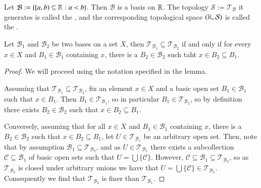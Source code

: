 \documentclass[12pt, a4paper, oneside, openright, titlepage]{book}
\begin{document}
\begin{definition}
    Let $\mathcal{B} := \{[a,b)\subseteq\mathbb R:a <b\}$. Then $\mathcal{B}$ is a basis on $\mathbb R$. The topology $\mathcal{S} := \mathcal{T}_{\mathcal{B}}$ it generates is called the , and the corresponding topological space $(\mathbb R,\mathcal{S})$ is called the . 
\end{definition}

\begin{lemma}
    Let $\mathcal{B}_1$ and $\mathcal{B}_2$ be two bases on a set $X$, then $\mathcal{T}_{\mathcal{B}_1} \subseteq \mathcal{T}_{\mathcal{B}_2}$ if and only if for every $x \in X$ and $B_1 \in \mathcal{B}_1$ containing $x$, there is a $B_2 \in \mathcal{B}_2$ such taht $x \in B_2 \subseteq B_1$.
\end{lemma}
\begin{proof}
    We will proceed using the notation specified in the lemma.

    Assuming that $\mathcal{T}_{\mathcal{B}_1}\subseteq \mathcal{T}_{\mathcal{B}_2}$, fix an element $x \in X$ and a basic open set $B_1 \in \mathcal{B}_1$ such that $x \in B_1$. Then $B_1 \in \mathcal{T}_{\mathcal{B}_1}$, so in particular $B_1 \in \mathcal{T}_{\mathcal{B}_2}$, so by definition there exists $B_2 \in \mathcal{B}_2$ such that $x \in B_2 \subseteq B_1$.


    Conversely, assuming that for all $x \in X$ and $B_1 \in \mathcal{B}_1$ containing $x$, there is a $B_2 \in \mathcal{B}_2$ such that $x \in B_2 \subseteq B_1$, let $U \in \mathcal{T}_{\mathcal{B}_1}$ be an arbitrary open set. Then, note that by assumption $\mathcal{B}_1 \subseteq \mathcal{T}_{\mathcal{B}_2}$, and as $U \in \mathcal{T}_{\mathcal{B}_1}$ there exists a subcollection $\mathcal{C} \subseteq \mathcal{B}_1$ of basic open sets such that $U = \bigcup\{\mathcal{C}\}$. However, $\mathcal{C} \subseteq \mathcal{B}_1\subseteq\mathcal{T}_{\mathcal{B}_2}$, so as $\mathcal{T}_{\mathcal{B}_2}$ is closed under arbitrary unions we have that $U =\bigcup\{\mathcal{C}\} \in \mathcal{T}_{\mathcal{B}_2}$. Consequently we find that $\mathcal{T}_{\mathcal{B}_2}$ is finer than $\mathcal{T}_{\mathcal{B}_1}$.
\end{proof}
\end{document}
